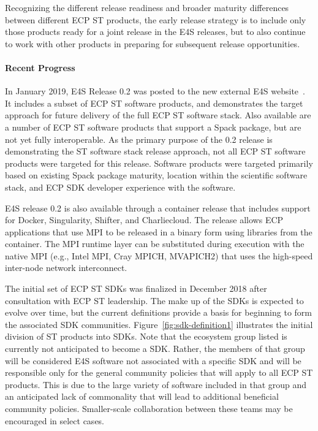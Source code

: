 Recognizing the different release readiness and broader maturity differences between different ECP ST products, the early release strategy is to include only those products ready for a joint release in the E4S releases, but to also continue to work with other products in preparing for subsequent release opportunities.

\paragraph{Recent Progress}
In January 2019, E4S Release 0.2 was posted to the new external E4S website~\cite{e4s:homepage}. It includes a subset of ECP ST software products, and demonstrates the target approach for future delivery of the full ECP ST software stack. Also available are a number of ECP ST software products that support a Spack package, but are not yet fully interoperable. As the primary purpose of the 0.2 release is demonstrating the ST software stack release approach, not all ECP ST software products were targeted for this release. Software products were targeted primarily based on existing Spack package maturity, location within the scientific software stack, and ECP SDK developer experience with the software.

E4S release 0.2 is also available through a container release that includes support for Docker, Singularity, Shifter, and Charliecloud. The release allows ECP applications that use MPI to be released in a binary form using libraries from the container. The MPI runtime layer can be substituted during execution with the native MPI (e.g., Intel MPI, Cray MPICH, MVAPICH2) that uses the high-speed inter-node network interconnect.

The initial set of ECP ST SDKs was finalized in December 2018 after consultation with ECP ST leadership. The make up of the SDKs is expected to evolve over time, but the current definitions provide a basis for beginning to form the associated SDK communities. Figure~\ref{fig:sdk-definition1} illustrates the initial division of ST products into SDKs. Note that the ecosystem group listed is currently not anticipated to become a SDK. Rather, the members of that group will be considered E4S software not associated with a specific SDK and will be responsible only for the general community policies that will apply to all ECP ST products. This is due to the large variety of software included in that group and an anticipated lack of commonality that will lead to additional beneficial community policies. Smaller-scale collaboration between these teams may be encouraged in select cases.

